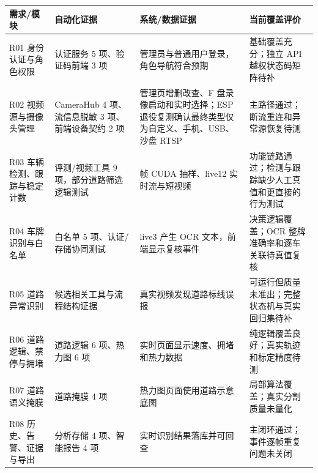 \begin{longtable}[]{@{}
  >{\raggedright\arraybackslash}p{}
  >{\raggedright\arraybackslash}p{}
  >{\raggedright\arraybackslash}p{}
  >{\raggedright\arraybackslash}p{}@{}}
\toprule\noalign{}
\begin{minipage}[b]{\linewidth}\raggedright
需求/模块
\end{minipage} & \begin{minipage}[b]{\linewidth}\raggedright
自动化证据
\end{minipage} & \begin{minipage}[b]{\linewidth}\raggedright
系统/数据证据
\end{minipage} & \begin{minipage}[b]{\linewidth}\raggedright
当前覆盖评价
\end{minipage} \\
\midrule\noalign{}
\endhead
\bottomrule\noalign{}
\endlastfoot
R01 身份认证与角色权限 & 认证服务 5 项、验证码前端 3 项 & 管理员与普通用户登录，角色导航符合预期 & 基础覆盖充分；独立 API 越权状态码矩阵待补 \\
R02 视频源与摄像头管理 & CameraHub 4 项、流信息脱敏 3 项、前端设备契约 2 项 & 管理页增删改查、F 盘录像启动和实时选择；ESP 退役复测确认最终类型仅为自定义、手机、USB、沙盘 RTSP & 主路径通过；断流重连和异常源恢复待测 \\
R03 车辆检测、跟踪与稳定计数 & 评测/视频工具 9 项，部分道路筛选逻辑测试 & 65 帧 CUDA 抽样、live12 实时流与短视频 & 功能链路通过；检测与跟踪缺少人工真值和更直接的行为测试 \\
R04 车牌识别与白名单 & 白名单 5 项、认证/存储协同测试 & live3 产生 OCR 文本，前端显示复核事件 & 决策逻辑覆盖；OCR 整牌准确率和逐车关联待真值复核 \\
R05 道路异常识别 & 候选相关工具与流程结构证据 & 真实视频发现道路标线误报 & 可运行但质量未准出；完整状态机与真实回归集待补 \\
R06 道路逻辑、禁停与拥堵 & 道路逻辑 6 项、热力图 6 项 & 实时页面显示速度、拥堵和热力数据 & 纯逻辑覆盖良好；真实轨迹和标定精度待测 \\
R07 道路语义掩膜 & 道路掩膜 4 项 & 热力图页面使用道路示意底图 & 局部算法覆盖；真实分割质量未量化 \\
R08 历史、告警、证据与导出 & 分析存储 4 项、智能报告 4 项 & 实时识别结果落库并可回查 & 主闭环通过；事件逐帧重复问题未关闭 \\

\end{longtable}
